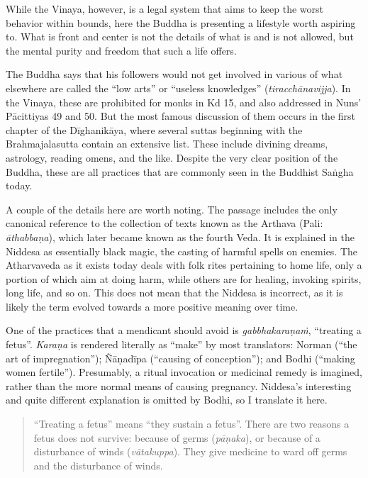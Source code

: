 \documentclass[12pt,openany]{book}%
\begin{document}
While the Vinaya, however, is a legal system that aims to keep the worst behavior within bounds, here the Buddha is presenting a lifestyle worth aspiring to. What is front and center is not the details of what is and is not allowed, but the mental purity and freedom that such a life offers.

The Buddha says that his followers would not get involved in various of what elsewhere are called the “low arts” or “useless knowledges” (\textit{\textsanskrit{tiracchānavijja}}). In the Vinaya, these are prohibited for monks in Kd 15, and also addressed in Nuns’ \textsanskrit{Pācittiyas} 49 and 50. But the most famous discussion of them occurs in the first chapter of the \textsanskrit{Dīghanikāya}, where several suttas beginning with the Brahmajalasutta contain an extensive list. These include divining dreams, astrology, reading omens, and the like. Despite the very clear position of the Buddha, these are all practices that are commonly seen in the Buddhist \textsanskrit{Saṅgha} today.

A couple of the details here are worth noting. The passage includes the only canonical reference to the collection of texts known as the Arthava (Pali: \textit{\textsanskrit{āthabbaṇa}}), which later became known as the fourth Veda. It is explained in the Niddesa as essentially black magic, the casting of harmful spells on enemies. The Atharvaveda as it exists today deals with folk rites pertaining to home life, only a portion of which aim at doing harm, while others are for healing, invoking spirits, long life, and so on. This does not mean that the Niddesa is incorrect, as it is likely the term evolved towards a more positive meaning over time.

One of the practices that a mendicant should avoid is \textit{\textsanskrit{gabbhakaraṇaṁ}}, “treating a fetus”. \textit{\textsanskrit{Karaṇa}} is rendered literally as “make” by most translators: Norman (“the art of impregnation”); \textsanskrit{Ñāṇadīpa} (“causing of conception”); and Bodhi (“making women fertile”). Presumably, a ritual invocation or medicinal remedy is imagined, rather than the more normal means of causing pregnancy. Niddesa’s interesting and quite different explanation is omitted by Bodhi, so I translate it here.

\begin{quotation}%
“Treating a fetus” means “they sustain a fetus”. There are two reasons a fetus does not survive: because of germs (\textit{\textsanskrit{pāṇaka}}), or because of a disturbance of winds (\textit{\textsanskrit{vātakuppa}}). They give medicine to ward off germs and the disturbance of winds.

%
\end{quotation}
\end{document}
